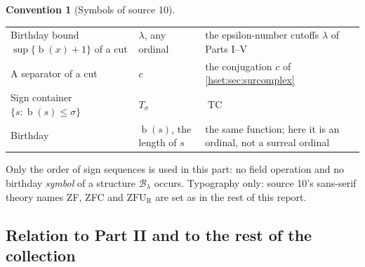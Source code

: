\documentclass[11pt,letterpaper]{article}
\theoremstyle{definition}
\newtheorem{convention}[convention]{Convention}\aliascntresetthe{convention}
\theoremstyle{remark}
\newcommand{\bd}{\operatorname{b}}
\newcommand{\TC}{\operatorname{TC}}
\newcommand{\B}{\mathcal B}
\newcommand{\ZFUR}{\mathrm{ZFU}_{\mathrm R}}
\begin{document}
\begin{convention}[Symbols of source 10]
\begin{center}
\begin{longtable}{@{}P{0.25\textwidth}P{0.22\textwidth}P{0.45\textwidth}@{}}
Birthday bound $\sup\{\bd(x)+1\}$ of a cut & $\lambda$, any ordinal & the epsilon-number cutoffs $\lambda$ of Parts I--V\\
A separator of a cut & $c$ & the conjugation $c$ of \cref{hset:sec:surcomplex}\\
Sign container $\{s:\bd(s)\le\sigma\}$ & $T_\sigma$ & $\TC$\\
Birthday & $\bd(s)$, the length of $s$ & the same function; here it is an ordinal, not a surreal ordinal\\
\bottomrule
\end{longtable}
\end{center}
Only the order of sign sequences is used in this part: no field operation and
no birthday \emph{symbol} of a structure $\B_\lambda$ occurs. Typography only:
source 10's sans-serif theory names ZF, ZFC and $\ZFUR$ are set as in the rest
of this report.
\end{convention}

\subsection{Relation to Part II and to the rest of the collection}
\label{hset:zr:sub:relation}
\end{document}
